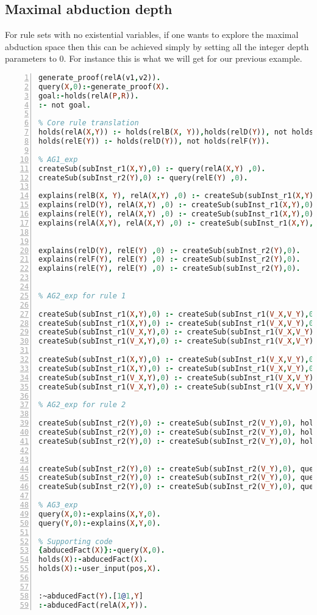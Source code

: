 \documentclass[sigconf]{acmart}
\begin{document}
\subsection{Maximal abduction depth}
For rule sets with no existential variables, if one wants to explore the maximal abduction space then this can be achieved simply by setting all the integer depth parameters to 0. For instance this is what we will get for our previous example.
\begin{lstlisting}[language=Prolog, numbers=left]
% Encoding the goal
generate_proof(relA(v1,v2)).
query(X,0):-generate_proof(X).
goal:-holds(relA(P,R)).
:- not goal.

% Core rule translation
holds(relA(X,Y)) :- holds(relB(X, Y)),holds(relD(Y)), not holds(relE(Y)).
holds(relE(Y)) :- holds(relD(Y)), not holds(relF(Y)).

% AG1_exp
createSub(subInst_r1(X,Y),0) :- query(relA(X,Y) ,0).
createSub(subInst_r2(Y),0) :- query(relE(Y) ,0).

explains(relB(X, Y), relA(X,Y) ,0) :- createSub(subInst_r1(X,Y),0).
explains(relD(Y), relA(X,Y) ,0) :- createSub(subInst_r1(X,Y),0).
explains(relE(Y), relA(X,Y) ,0) :- createSub(subInst_r1(X,Y),0).
explains(relA(X,Y), relA(X,Y) ,0) :- createSub(subInst_r1(X,Y),0).


explains(relD(Y), relE(Y) ,0) :- createSub(subInst_r2(Y),0).
explains(relF(Y), relE(Y) ,0) :- createSub(subInst_r2(Y),0).
explains(relE(Y), relE(Y) ,0) :- createSub(subInst_r2(Y),0).


% AG2_exp for rule 1

createSub(subInst_r1(X,Y),0) :- createSub(subInst_r1(V_X,V_Y),0), holds(relA(X,Y)).
createSub(subInst_r1(X,Y),0) :- createSub(subInst_r1(V_X,V_Y),0), holds(relB(X,Y)).
createSub(subInst_r1(V_X,Y),0) :- createSub(subInst_r1(V_X,V_Y),0), holds(relD(Y)).
createSub(subInst_r1(V_X,Y),0) :- createSub(subInst_r1(V_X,V_Y),0), holds(relE(Y)).

createSub(subInst_r1(X,Y),0) :- createSub(subInst_r1(V_X,V_Y),0), query(relA(X,Y),0).
createSub(subInst_r1(X,Y),0) :- createSub(subInst_r1(V_X,V_Y),0), query(relB(X,Y),0).
createSub(subInst_r1(V_X,Y),0) :- createSub(subInst_r1(V_X,V_Y),0), query(relD(Y),0).
createSub(subInst_r1(V_X,Y),0) :- createSub(subInst_r1(V_X,V_Y),0), query(relF(Y),0).

% AG2_exp for rule 2

createSub(subInst_r2(Y),0) :- createSub(subInst_r2(V_Y),0), holds(relE(Y)).
createSub(subInst_r2(Y),0) :- createSub(subInst_r2(V_Y),0), holds(relD(Y)).
createSub(subInst_r2(Y),0) :- createSub(subInst_r2(V_Y),0), holds(relF(Y)).


createSub(subInst_r2(Y),0) :- createSub(subInst_r2(V_Y),0), query(relE(Y),0).
createSub(subInst_r2(Y),0) :- createSub(subInst_r2(V_Y),0), query(relD(Y),0).
createSub(subInst_r2(Y),0) :- createSub(subInst_r2(V_Y),0), query(relF(Y),0).

% AG3_exp
query(X,0):-explains(X,Y,0).
query(Y,0):-explains(X,Y,0).

% Supporting code
{abducedFact(X)}:-query(X,0).
holds(X):-abducedFact(X).
holds(X):-user_input(pos,X).


:~abducedFact(Y).[1@1,Y]
:-abducedFact(relA(X,Y)).
\end{lstlisting}
\end{document}
